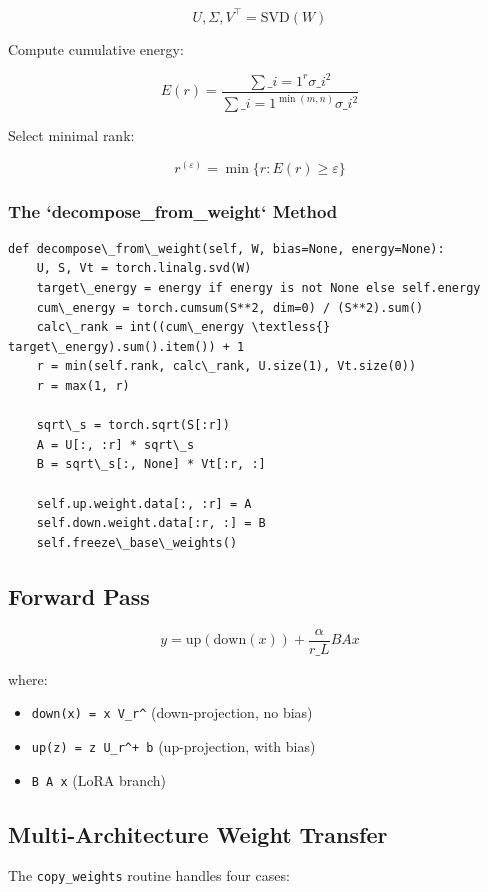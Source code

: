 \[
U, \Sigma, V^\top = \text{SVD}(W)
\tag{4.1}
\]

Compute cumulative energy:

\[
E(r) = \frac{\sum\_{i=1}^r \sigma\_i^2}{\sum\_{i=1}^{\min(m,n)} \sigma\_i^2}
\tag{4.2}
\]

Select minimal rank:

\[
r^{(\varepsilon)} = \min\{r : E(r) \geq \varepsilon\}
\tag{4.3}
\]

\subsubsection{The `decompose\_from\_weight` Method}

\begin{lstlisting}
def decompose\_from\_weight(self, W, bias=None, energy=None):
    U, S, Vt = torch.linalg.svd(W)
    target\_energy = energy if energy is not None else self.energy
    cum\_energy = torch.cumsum(S**2, dim=0) / (S**2).sum()
    calc\_rank = int((cum\_energy \textless{} target\_energy).sum().item()) + 1
    r = min(self.rank, calc\_rank, U.size(1), Vt.size(0))
    r = max(1, r)
    
    sqrt\_s = torch.sqrt(S[:r])
    A = U[:, :r] * sqrt\_s
    B = sqrt\_s[:, None] * Vt[:r, :]
    
    self.up.weight.data[:, :r] = A
    self.down.weight.data[:r, :] = B
    self.freeze\_base\_weights()
\end{lstlisting}

\subsection{Forward Pass}

\[
y = \text{up}(\text{down}(x)) + \frac{\alpha}{r\_L} B A x
\tag{4.4}
\]

where:
\begin{itemize}
\item \texttt{down(x) = x V\_r^\top} (down-projection, no bias)
\item \texttt{up(z) = z U\_r^\top + b} (up-projection, with bias)
\item \texttt{B A x} (LoRA branch)

\end{itemize}
\subsection{Multi-Architecture Weight Transfer}

The \texttt{copy\_weights} routine handles four cases:


